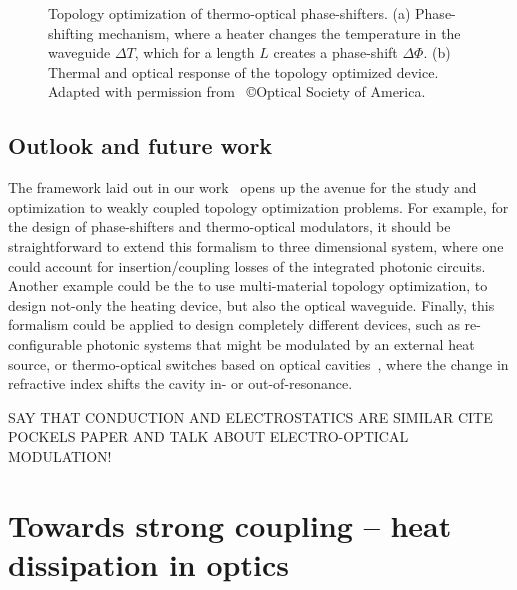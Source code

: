 \begin{figure}[tb]
    \centering
    \caption{Topology optimization of thermo-optical phase-shifters. (a) Phase-shifting mechanism, where a heater changes the temperature in the waveguide $\Delta T$, which for a length $L$ creates a phase-shift
    $\Delta \Phi$. (b) Thermal and optical response of the topology optimized device. Adapted with permission from~\cite{ownpub0} \copyright Optical Society of America.}
    \label{fig:thermo_res}
\end{figure}

\subsection*{Outlook and future work}

The framework laid out in our work~\cite{ownpub0} opens up the avenue for the study and optimization to weakly coupled topology optimization problems. For example, for the design of phase-shifters and thermo-optical modulators, it should be straightforward to extend this
formalism to three dimensional system, where one could account for insertion/coupling losses of the integrated photonic circuits. Another example could be the to use multi-material topology optimization, to design not-only the heating
device, but also the optical waveguide. Finally, this formalism could be applied to design completely different devices, such as re-configurable photonic systems that might be modulated by an external heat source, or thermo-optical
switches based on optical cavities~\cite{switch, switch_2}, where the change in refractive index shifts the cavity in- or out-of-resonance.

SAY THAT CONDUCTION AND ELECTROSTATICS ARE SIMILAR CITE POCKELS PAPER AND TALK ABOUT ELECTRO-OPTICAL MODULATION!

\section{Towards strong coupling -- heat dissipation in optics}\label{sec:thermo_strong_coupling}

